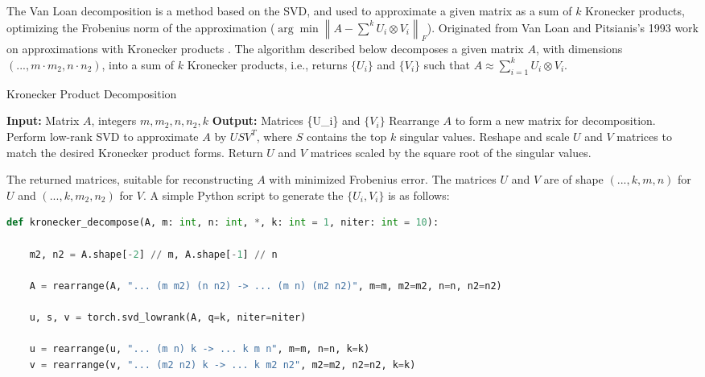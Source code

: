 \documentclass{article}
\begin{document}
{The Van Loan decomposition is a method based on the SVD, and used to approximate a given matrix as a sum of \( k \) Kronecker products, optimizing the Frobenius norm of the approximation ($\arg\min \left\| A - \sum_{}^{k} U_i \otimes V_i \right\|_F$). Originated from Van Loan and Pitsianis's 1993 work on approximations with Kronecker products \cite{van1993approximation}. The algorithm described below decomposes a given matrix \( A \), with dimensions \((..., m \cdot m_2, n \cdot n_2)\), into a sum of \( k \) Kronecker products, i.e., returns \( \{U_i\} \) and \( \{V_i\} \) such that \( A \approx \sum_{i=1}^k U_i \otimes V_i \).






\begin{algorithm}
	\caption{Kronecker Product Decomposition}
	\begin{algorithmic}[1]
		\State \textbf{Input:} Matrix \( A \), integers \( m, m_2, n, n_2, k \)
		\State \textbf{Output:} Matrices  \{U_i\} \) and \( \{V_i\} \) 
		\State Rearrange \( A \) to form a new matrix for decomposition.
		\State Perform low-rank SVD to approximate \( A \) by \( U S V^T \), where \( S \) contains the top \( k \) singular values.
		\State Reshape and scale \( U \) and \( V \) matrices to match the desired Kronecker product forms.
		\State Return \( U \) and \( V \) matrices scaled by the square root of the singular values.
	\end{algorithmic}
\end{algorithm}


The returned matrices, suitable for reconstructing \( A \) with minimized Frobenius error. The matrices \( U \) and \( V \) are of shape \( (..., k, m, n) \) for \( U \) and \( (..., k, m_2, n_2) \) for \( V \). A simple Python script to generate the $\{U_i,V_i\}$ is as follows:



\begin{lstlisting}[language=Python]
def kronecker_decompose(A, m: int, n: int, *, k: int = 1, niter: int = 10):

    m2, n2 = A.shape[-2] // m, A.shape[-1] // n
	
    A = rearrange(A, "... (m m2) (n n2) -> ... (m n) (m2 n2)", m=m, m2=m2, n=n, n2=n2)

    u, s, v = torch.svd_lowrank(A, q=k, niter=niter)

    u = rearrange(u, "... (m n) k -> ... k m n", m=m, n=n, k=k)
    v = rearrange(v, "... (m2 n2) k -> ... k m2 n2", m2=m2, n2=n2, k=k)


\end{lstlisting}}
\end{document}
